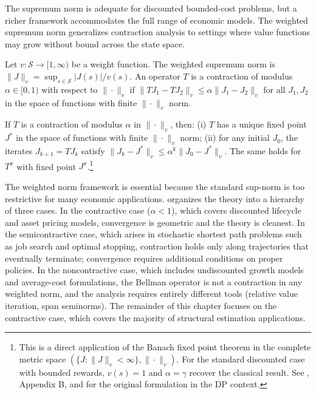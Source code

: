 The supremum norm is adequate for discounted bounded-cost problems, but a richer framework accommodates the full range of economic models. The weighted supremum norm generalizes contraction analysis to settings where value functions may grow without bound across the state space.

\begin{definition}
\label{def:weighted_contraction}
Let $v: \mathcal{S} \to [1, \infty)$ be a weight function. The weighted supremum norm is $\|J\|_v = \sup_{s \in \mathcal{S}} |J(s)| / v(s)$. An operator $T$ is a contraction of modulus $\alpha \in [0,1)$ with respect to $\|\cdot\|_v$ if $\|TJ_1 - TJ_2\|_v \leq \alpha \|J_1 - J_2\|_v$ for all $J_1, J_2$ in the space of functions with finite $\|\cdot\|_v$ norm.
\end{definition}

\begin{theorem}
\label{thm:geometric_convergence}
If $T$ is a contraction of modulus $\alpha$ in $\|\cdot\|_v$, then: (i) $T$ has a unique fixed point $J^*$ in the space of functions with finite $\|\cdot\|_v$ norm; (ii) for any initial $J_0$, the iterates $J_{k+1} = TJ_k$ satisfy $\|J_k - J^*\|_v \leq \alpha^k \|J_0 - J^*\|_v$. The same holds for $T^\pi$ with fixed point $J^\pi$.\footnote{This is a direct application of the Banach fixed point theorem in the complete metric space $(\{J : \|J\|_v < \infty\}, \|\cdot\|_v)$. For the standard discounted case with bounded rewards, $v(s) = 1$ and $\alpha = \gamma$ recover the classical result. See \citet{bertsekas2022}, Appendix B, and \citet{denardo1967} for the original formulation in the DP context.}
\end{theorem}

The weighted norm framework is essential because the standard sup-norm is too restrictive for many economic applications. \citet{bertsekas2022} organizes the theory into a hierarchy of three cases. In the contractive case ($\alpha < 1$), which covers discounted lifecycle and asset pricing models, convergence is geometric and the theory is cleanest. In the semicontractive case, which arises in stochastic shortest path problems such as job search and optimal stopping, contraction holds only along trajectories that eventually terminate; convergence requires additional conditions on proper policies. In the noncontractive case, which includes undiscounted growth models and average-cost formulations, the Bellman operator is not a contraction in any weighted norm, and the analysis requires entirely different tools (relative value iteration, span seminorms). The remainder of this chapter focuses on the contractive case, which covers the majority of structural estimation applications.

